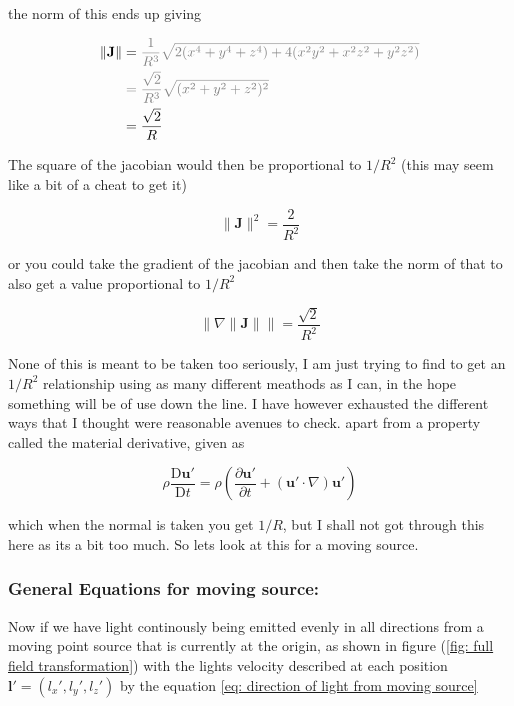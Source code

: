 the norm of this ends up giving

\begin{equation}
	\begin{aligned}
	\|\mathbf{J}\| &= \color{gray} \frac{1}{R^3} \sqrt{2(x^4 + y^4 + z^4) + 4 (x^2y^2 + x^2z^2 + y^2z^2)} \\
	& \color{gray} = \frac{\sqrt{2}}{R^3} \sqrt{(x^2 + y^2 + z^2)^2} \\
	 &= \frac{\sqrt{2}}{ R }
\end{aligned}
\end{equation}

The square of the jacobian would then be proportional to $1/R^2$ (this may seem like a bit of a cheat to get it)

\begin{equation}
	\|\mathbf{J}\|^2 = \frac{2}{R^2}
\end{equation}

or you could take the gradient of the jacobian and then take the norm of that to also get a value proportional to $1/R^2$

\begin{equation}
	\big\| \nabla \|\mathbf{J}\| \big\| = \frac{\sqrt{2}}{R^2}
\end{equation}

None of this is meant to be taken too seriously, I am just trying to find to get an $1/R^2$ relationship using as many different meathods as I can, in the hope something will be of use down the line.
I have however exhausted the different ways that I thought were reasonable avenues to check. apart from a property called the material derivative, given as

\begin{equation}
	\rho {\frac {\mathrm {D} \mathbf {u'} }{\mathrm {D} t}}=\rho \left({\frac {\partial \mathbf {u'} }{\partial t}}+(\mathbf {u'} \cdot \nabla )\mathbf {u'} \right)
\end{equation}

which when the normal is taken you get $1/R$, but I shall not got through this here as its a bit too much.
So lets look at this for a moving source.

\subsubsection{General Equations for moving source:}\label{subsubsect: General Equations for Moving Source 3}

Now if we have light continously being emitted evenly in all directions from a moving point source that is currently at the origin, as shown in figure (\ref{fig: full field transformation}) with the lights velocity described at each position $\mathbf{l'}=(l_x',l_y',l_z')$ by the equation \eqref{eq: direction of light from moving source}


